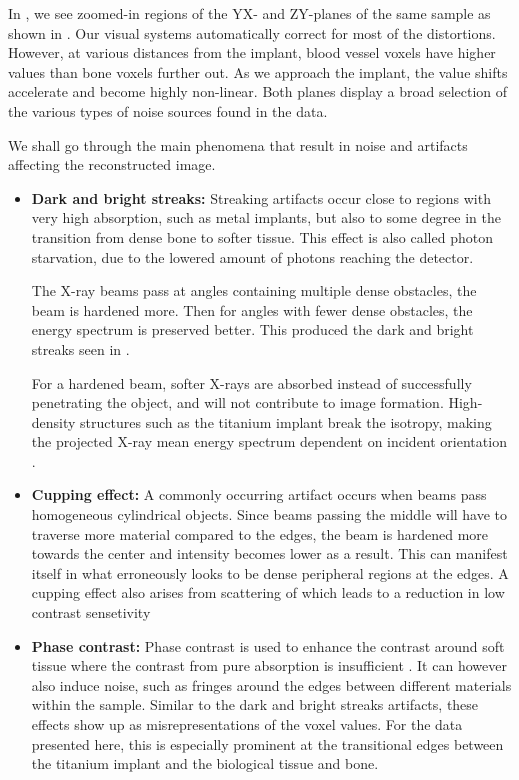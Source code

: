 In , we see zoomed-in regions of the YX- and ZY-planes of the
same sample as shown in .  Our visual systems
automatically correct for most of the distortions. However, at various
distances from the implant, blood vessel voxels have higher values than bone
voxels further out. As we approach the implant, the value shifts accelerate and
become highly non-linear.  Both planes display a broad selection of the various
types of noise sources found in the data.

We shall go through the main phenomena that result in noise and artifacts
affecting the reconstructed image.

\begin{itemize}
  \item \textbf{Dark and bright streaks:} Streaking artifacts occur close to
	regions with very high absorption, such as metal implants, but also
	to some degree in the transition from dense bone to softer
	tissue.
	This effect is also called photon starvation, due to the
	lowered amount of photons reaching the detector.

	The X-ray beams pass at angles containing
	multiple dense obstacles, the beam is hardened more. Then for
	angles with fewer dense obstacles, the energy spectrum is
	preserved better. This produced the dark and bright streaks
	seen in .

	For a hardened beam, softer X-rays are absorbed instead of
	successfully penetrating the object, and will not contribute to
	image formation.  High-density structures such as the titanium
	implant break the isotropy, making the projected X-ray mean
	energy spectrum dependent on incident orientation
	\citep{srnoise}.


  \item \textbf{Cupping effect:} A commonly occurring artifact occurs when beams pass
    homogeneous cylindrical objects. Since beams passing the middle will have to
	traverse more material compared to the edges, the beam is hardened more
	towards the center and intensity becomes lower as a result. This can
	manifest itself in what erroneously looks to be dense peripheral
	regions at the edges. A cupping effect also arises from scattering of
	which leads to a reduction in low contrast sensetivity

  \item \textbf{Phase contrast:} Phase contrast is used to enhance the contrast
	around soft tissue where the contrast from pure absorption is
	insufficient \citep{phasecontrast}. It can however also induce
	noise, such as fringes around the edges between different
	materials within the sample\citep{srnoise}. Similar to the dark
	and bright streaks artifacts, these effects show up as
	misrepresentations of the voxel values. For the data presented
	here, this is especially prominent at the transitional edges
	between the titanium implant and the biological tissue and
	bone.


\end{itemize}
